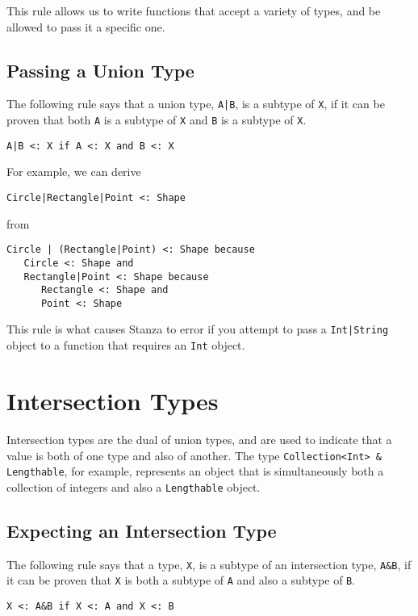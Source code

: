 \documentclass[10pt,oneside]{book}
\begin{document}
This rule allows us to write functions that accept a variety of types, and be allowed to pass it a specific one.

\subsection*{Passing a Union Type}
The following rule says that a union type, \texttt{\frenchspacing A|B}, is a subtype of \texttt{\frenchspacing X}, if it can be proven that both \texttt{\frenchspacing A} is a subtype of \texttt{\frenchspacing X} and \texttt{\frenchspacing B} is a subtype of \texttt{\frenchspacing X}.
\begin{lstlisting}
A|B <: X if A <: X and B <: X
\end{lstlisting}

For example, we can derive
\begin{lstlisting}
Circle|Rectangle|Point <: Shape
\end{lstlisting}
from
\begin{lstlisting}
Circle | (Rectangle|Point) <: Shape because
   Circle <: Shape and
   Rectangle|Point <: Shape because
      Rectangle <: Shape and
      Point <: Shape
\end{lstlisting}

This rule is what causes Stanza to error if you attempt to pass a \texttt{\frenchspacing Int|String} object to a function that requires an \texttt{\frenchspacing Int} object.

\section{Intersection Types}
Intersection types are the dual of union types, and are used to indicate that a value is both of one type and also of another. The type \texttt{\frenchspacing Collection<Int> \& Lengthable}, for example, represents an object that is simultaneously both a collection of integers and also a \texttt{\frenchspacing Lengthable} object.

\subsection*{Expecting an Intersection Type}
The following rule says that a type, \texttt{\frenchspacing X}, is a subtype of an intersection type, \texttt{\frenchspacing A\&B}, if it can be proven that \texttt{\frenchspacing X} is both a subtype of \texttt{\frenchspacing A} and also a subtype of \texttt{\frenchspacing B}.
\begin{lstlisting}
X <: A&B if X <: A and X <: B
\end{lstlisting}
\end{document}
